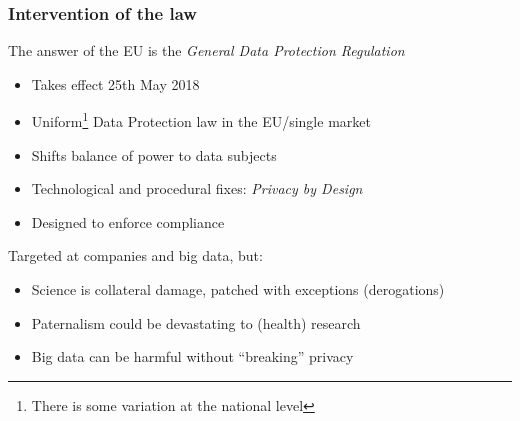\documentclass[xcolor=dvipsnames]{beamer}
\begin{document}
	
\begin{frame}
	\frametitle{Intervention of the law}
	\begin{block}{The answer of the EU is the {\em General Data Protection Regulation}}
	\begin{itemize}
	\item Takes effect 25th May 2018
	\item Uniform\footnote[frame]{There is some variation at the national level} Data Protection law in the EU/single market
	\item Shifts balance of power to data subjects
	\item Technological and procedural fixes: {\em Privacy by Design}
	\item Designed to enforce compliance
	\end{itemize}
	\end{block}
	
	\begin{block}{Targeted at companies and big data, but:}
	\begin{itemize}
	\item Science is collateral damage, patched with exceptions (derogations)
	\item Paternalism could be devastating to (health) research
	\item Big data can be harmful without ``breaking'' privacy 
	\end{itemize}
	\end{block}
\end{frame}
	
\end{document}
